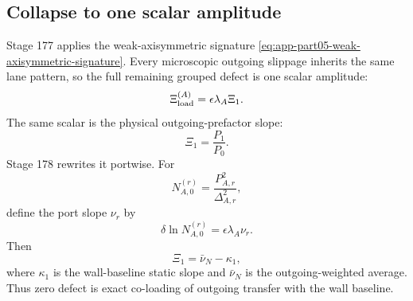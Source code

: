 \subsection{Collapse to one scalar amplitude}
Stage 177 applies the weak-axisymmetric signature \eqref{eq:app-part05-weak-axisymmetric-signature}.  Every microscopic outgoing slippage inherits the same lane pattern, so the full remaining grouped defect is one scalar amplitude:
\begin{equation}
\label{eq:app-part05-Xi1-definition}
\Xi_{\rm load}^{(A)}=\epsilon\lambda_A\Xi_1.
\end{equation}
The same scalar is the physical outgoing-prefactor slope:
\begin{equation}
\label{eq:app-part05-Xi1-P1P0}
\Xi_1=\frac{P_1}{P_0}.
\end{equation}
Stage 178 rewrites it portwise.  For
\begin{equation}
\label{eq:app-part05-port-N-static}
N_{A,0}^{(r)}=\frac{P_{A,r}^2}{\Delta_{A,r}^2},
\end{equation}
define the port slope \(\nu_r\) by
\begin{equation}
\label{eq:app-part05-nu-r-def}
\delta\ln N_{A,0}^{(r)}=\epsilon\lambda_A\nu_r.
\end{equation}
Then
\begin{equation}
\label{eq:app-part05-Xi1-port-coloading}
\Xi_1=\bar\nu_N-\kappa_1,
\end{equation}
where \(\kappa_1\) is the wall-baseline static slope and \(\bar\nu_N\) is the outgoing-weighted average.  Thus zero defect is exact co-loading of outgoing transfer with the wall baseline.

